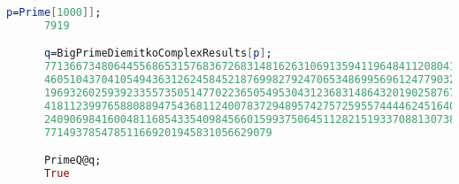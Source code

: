       \begin{lstlisting}[language=Mathematica,caption={Пример 3}]
      p=Prime[1000]];
      7919

      q=BigPrimeDiemitkoComplexResults[p];
      77136673480644556865315768367268314816263106913594119648411208041116063926102788742047941420\
      460510437041054943631262458452187699827924706534869956961247790320954339348028256271194127453\
      196932602593923355735051477022365054953043123683148643201902587671779138858676653809127260758\
      418112399765880889475436811240078372948957427572595574444624516405916208870454959690923772800\
      240906984160048116854335409845660159937506451128215193370881307388134246284948149750620719092\
      771493785478511669201945831056629079

      PrimeQ@q;
      True
      \end{lstlisting}